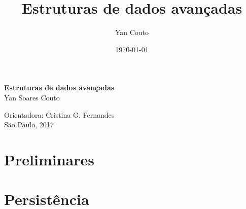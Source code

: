 \documentclass[11pt,oneside,a4paper, openany]{book}
\title{Estruturas de dados avançadas}
\author{Yan Couto}
\date{\today}
\begin{document}
\frontmatter 

\onehalfspacing  %

\thispagestyle{empty}
\begin{center}
	\vspace*{2.3cm}
	\textbf{\huge{Estruturas de dados avançadas}}\\

	\vspace*{1cm}
	\Large{Yan Soares Couto}

	\vskip 1.8cm
	Orientadora: Cristina G. Fernandes\\

	\vspace{\fill}
	\normalsize{São Paulo, 2017}
\end{center}

\setcounter{tocdepth}{1}

\begingroup
\let\cleardoublepage\clearpage
\tableofcontents
\endgroup

\mainmatter
{}

\part{Preliminares}


\part{Persistência}












\end{document}
